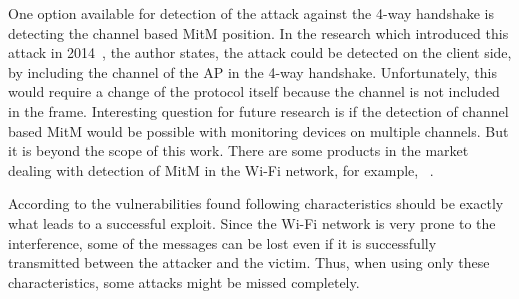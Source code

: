One option available for detection of the attack against the 4-way handshake is detecting the channel based MitM position. In the research which introduced this attack in 2014~\cite{Va_2014}, the author states, the attack could be detected on the client side, by including the channel of the AP in the 4-way handshake. Unfortunately, this would require a change of the protocol itself because the channel is not included in the frame. Interesting question for future research is if the detection of channel based MitM would be possible with monitoring devices on multiple channels. But it is beyond the scope of this work. There are some products in the market dealing with detection of MitM in the Wi-Fi network, for example, ~\cite{zimperium_2018}.

According to the vulnerabilities found following characteristics should be exactly what leads to a successful exploit. Since the Wi-Fi network is very prone to the interference, some of the messages can be lost even if it is successfully transmitted between the attacker and the victim. Thus, when using only these characteristics, some attacks might be missed completely.

